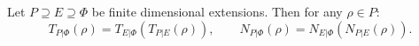 Let $P \supseteq E \supseteq \Phi$ be finite dimensional extensions. Then for any $\rho \in P$:
$$T_{P|\Phi}(\rho) = T_{E|\Phi}(T_{P|E}(\rho)), \qquad N_{P|\Phi}(\rho) = N_{E|\Phi}(N_{P|E}(\rho)).$$
